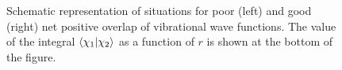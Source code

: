 \documentclass[a4paper]{article}
\begin{document}
\begin{figure}[H]
\begin{tikzpicture}[scale=0.9]
  \end{tikzpicture}
  \caption{Schematic representation of situations for poor (left) and good (right) net positive overlap of vibrational wave functions. The value of the integral $\bra{\chi_{1}}\ket{\chi_{2}}$ as a function of $r$ is shown at the bottom of the figure.}
  \label{fig:frank-condon}
\end{figure}
\end{document}
